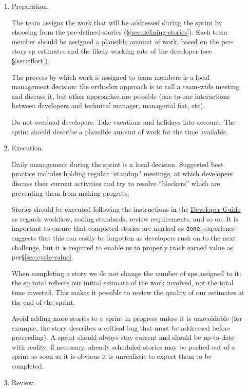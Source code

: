 \begin{enumerate}
\item
  Preparation.

  The team assigns the work that will be addressed during the sprint by choosing from the pre-defined stories (\S\ref{sec:defining-stories}).
  Each team member should be assigned a plausible amount of work, based on the per-\gls{story} \gls{sp} estimates and the likely working rate of the developer (see \S\ref{sec:effort}).

  The process by which work is assigned to team members is a local
  management decision: the orthodox approach is to call a team-wide
  meeting and discuss it, but other approaches are possible (one-to-one
  interactions between developers and technical manager, managerial
  fiat, etc).

  Do not overload developers. Take vacations and holidays into account.
  The sprint should describe a plausible amount of work for the time
  available.
\item
  Execution.

  Daily management during the sprint is a local decision. Suggested best
  practice includes holding regular ``standup'' meetings, at which
  developers discuss their current activities and try to resolve
  ``blockers'' which are preventing them from making progress.

  Stories should be executed following the instructions in the
  \href{http://developer.lsst.io/}{Developer Guide} as regards workflow,
  coding standards, review requirements, and so on. It is important to
  ensure that completed stories are marked as \texttt{done}:
  experience suggests that this can easily be forgotten as developers
  rush on to the next challenge, but it is required to enable us to
  properly track earned value as per\S\ref{sec:cycle-value}.

  When completing a \gls{story} we do not change the number of \glspl{sp} assigned to
  it: the \gls{sp} total reflects our initial estimate of the work involved,
  not the total time invested. This makes it possible to review the
  quality of our estimates at the end of the sprint.

  Avoid adding more stories to a sprint in progress unless it is
  unavoidable (for example, the \gls{story} describes a critical bug that must
  be addressed before proceeding). A sprint should always stay current
  and should be up-to-date with reality; if necessary, already scheduled
  stories may be pushed out of a sprint as soon as it is obvious it is
  unrealistic to expect them to be completed.
\item
  Review.


\end{enumerate}
